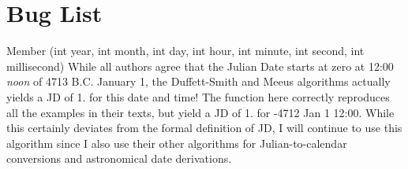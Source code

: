 \chapter{Bug List}
\hypertarget{bug}{}\label{bug}

\begin{DoxyRefList}
\item[Member \doxylink{newfms_8h_a6fe4694775b1ae146260348070c37a1f}{CDT\+\_\+\+Julian\+Date} (int year, int month, int day, int hour, int minute, int second, int millisecond)]\label{bug__bug000001}%
%
 While all authors agree that the Julian Date starts at zero at 12\+:00 {\itshape noon} of 4713 B.\+C. January 1, the Duffett-\/\+Smith and Meeus algorithms actually yields a JD of 1. for this date and time! The function here correctly reproduces all the examples in their texts, but yield a JD of 1. for -\/4712 Jan 1 12\+:00.  While this certainly deviates from the formal definition of JD, I will continue to use this algorithm since I also use their other algorithms for Julian-\/to-\/calendar conversions and astronomical date derivations.
\end{DoxyRefList}